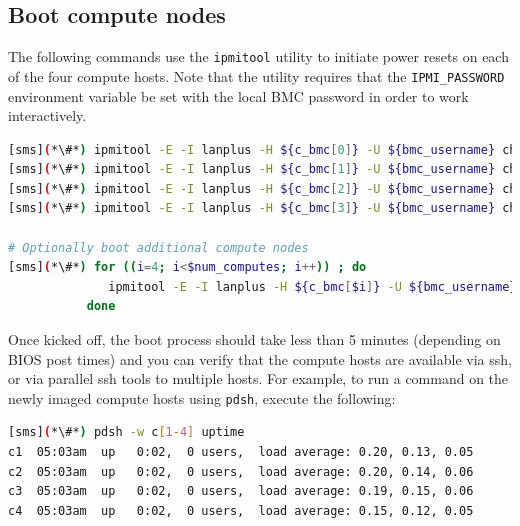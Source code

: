 \documentclass[letterpaper]{article}
\begin{document}




\subsection{Boot compute nodes} \label{sec:boot_computes}

 
The following commands use the \texttt{ipmitool} utility to initiate power
resets on each of the four compute hosts. Note that the utility requires that
the \texttt{IPMI\_PASSWORD} environment variable be set with the local BMC password in
order to work interactively.

\begin{lstlisting}[language=bash,keywords={},upquote=true]
[sms](*\#*) ipmitool -E -I lanplus -H ${c_bmc[0]} -U ${bmc_username} chassis power reset   # power cycle c1
[sms](*\#*) ipmitool -E -I lanplus -H ${c_bmc[1]} -U ${bmc_username} chassis power reset   # power cycle c2
[sms](*\#*) ipmitool -E -I lanplus -H ${c_bmc[2]} -U ${bmc_username} chassis power reset   # power cycle c3
[sms](*\#*) ipmitool -E -I lanplus -H ${c_bmc[3]} -U ${bmc_username} chassis power reset   # power cycle c4

# Optionally boot additional compute nodes
[sms](*\#*) for ((i=4; i<$num_computes; i++)) ; do
              ipmitool -E -I lanplus -H ${c_bmc[$i]} -U ${bmc_username} chassis power reset
           done
\end{lstlisting} 

Once kicked off, the boot process should take less than 5 minutes (depending on
BIOS post times) and you can verify that the compute hosts are available via
ssh, or via parallel ssh tools to multiple hosts. For example, to run a command
on the newly imaged compute hosts using \texttt{pdsh}, execute the following:

\begin{lstlisting}[language=bash]
[sms](*\#*) pdsh -w c[1-4] uptime
c1  05:03am  up   0:02,  0 users,  load average: 0.20, 0.13, 0.05
c2  05:03am  up   0:02,  0 users,  load average: 0.20, 0.14, 0.06
c3  05:03am  up   0:02,  0 users,  load average: 0.19, 0.15, 0.06
c4  05:03am  up   0:02,  0 users,  load average: 0.15, 0.12, 0.05
\end{lstlisting}
\end{document}
